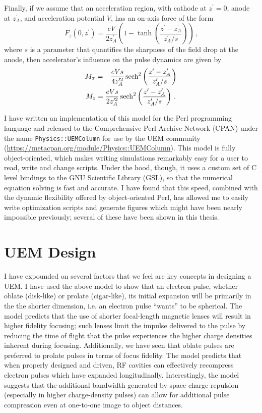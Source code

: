 Finally, if we assume that an acceleration region, with cathode at $z^{\prime} = 0$, anode at $z^{\prime}_A$, and acceleration potential $V$, has an on-axis force of the form
\begin{equation}
  F_z(0,z^{\prime}) = \frac{eV}{2z^{\prime}_A} \left( 1 - \tanh \left( \frac{ z^{\prime} - z^{\prime}_A }{ z^{\prime}_A / s } \right) \right) \,\text{,}
\end{equation}
where $s$ is a parameter that quantifies the sharpness of the field drop at the anode, then accelerator's influence on the pulse dynamics are given by
\begin{gather}
  M_{{\scriptscriptstyle T}} = -\frac{eVs}{4z^{\prime 2}_A} \operatorname{sech}^2 \left( \frac{z^{\prime} - z^{\prime}_A }{ z^{\prime}_A / s } \right) \\
  M_z = \frac{eVs}{2z^{\prime 2}_A} \operatorname{sech}^2 \left( \frac{z^{\prime} - z^{\prime}_A }{ z^{\prime}_A / s } \right) \, \text{.}
\end{gather}

I have written an implementation of this model for the Perl programming language and released to the Comprehensive Perl Archive Network (CPAN) under the name \verb!Physics::UEMColumn! for use by the UEM community (\url{https://metacpan.org/module/Physics::UEMColumn}).
This model is fully object-oriented, which makes writing simulations remarkably easy for a user to read, write and change scripts.
Under the hood, though, it uses a custom set of C level bindings to the GNU Scientific Library (GSL), so that the numerical equation solving is fast and accurate.
I have found that this speed, combined with the dynamic flexibility offered by object-oriented Perl, has allowed me to easily write optimization scripts and generate figures which might have been nearly impossible previously; several of these have been shown in this thesis.

\section{UEM Design}

I have expounded on several factors that we feel are key concepts in designing a UEM.
I have used the above model to show that an electron pulse, whether oblate (disk-like) or prolate (cigar-like), its initial expansion will be primarily in the the shorter dimension, i.e. an electron pulse ``wants'' to be spherical.
The model predicts that the use of shorter focal-length magnetic lenses will result in higher fidelity focusing; such lenses limit the impulse delivered to the pulse by reducing the time of flight that the pulse experiences the higher charge densities inherent during focusing.
Additionally, we have seen that oblate pulses are preferred to prolate pulses in terms of focus fidelity.
The model predicts that when properly designed and driven, RF cavities can effectively recompress electron pulses which have expanded longitudinally.
Interestingly, the model suggests that the additional bandwidth generated by space-charge repulsion (especially in higher charge-density pulses) can allow for additional pulse compression even at one-to-one image to object distances.

